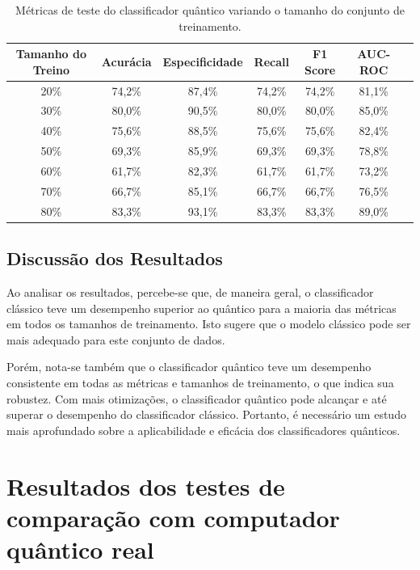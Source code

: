 \begin{table}[H]
\centering
\caption{Métricas de teste do classificador quântico variando o tamanho do conjunto de treinamento.}
\begin{tabular}{|c|c|c|c|c|c|c|}
\hline
\textbf{Tamanho do Treino} & \textbf{Acurácia} & \textbf{Especificidade} & \textbf{Recall} & \textbf{F1 Score} & \textbf{AUC-ROC} \\ \hline
20\% & 74,2\% & 87,4\% & 74,2\% & 74,2\% & 81,1\% \\ \hline
30\% & 80,0\% & 90,5\% & 80,0\% & 80,0\% & 85,0\% \\ \hline
40\% & 75,6\% & 88,5\% & 75,6\% & 75,6\% & 82,4\% \\ \hline
50\% & 69,3\% & 85,9\% & 69,3\% & 69,3\% & 78,8\% \\ \hline
60\% & 61,7\% & 82,3\% & 61,7\% & 61,7\% & 73,2\% \\ \hline
70\% & 66,7\% & 85,1\% & 66,7\% & 66,7\% & 76,5\% \\ \hline
80\% & 83,3\% & 93,1\% & 83,3\% & 83,3\% & 89,0\% \\ \hline
\end{tabular}
\end{table}

\subsection{Discussão dos Resultados}

Ao analisar os resultados, percebe-se que, de maneira geral, o classificador clássico teve um desempenho superior ao quântico para a maioria das métricas em todos os tamanhos de treinamento. Isto sugere que o modelo clássico pode ser mais adequado para este conjunto de dados. 

Porém, nota-se também que o classificador quântico teve um desempenho consistente em todas as métricas e tamanhos de treinamento, o que indica sua robustez. Com mais otimizações, o classificador quântico pode alcançar e até superar o desempenho do classificador clássico. Portanto, é necessário um estudo mais aprofundado sobre a aplicabilidade e eficácia dos classificadores quânticos.

\section{Resultados dos testes de comparação com computador quântico real}

